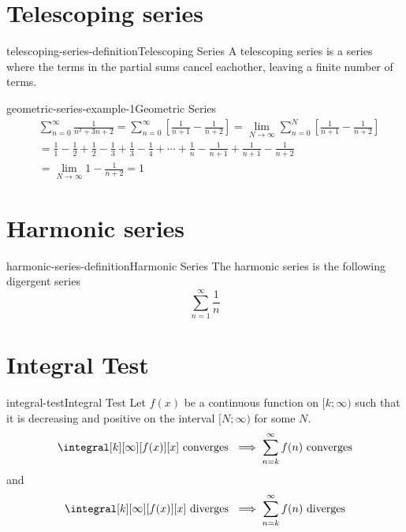 \documentclass[preview]{standalone}
\begin{document}
\section{Telescoping series}

\begin{snippetdefinition}{telescoping-series-definition}{Telescoping Series}
    A telescoping series is a series where the terms in the partial sums cancel eachother,
    leaving a finite number of terms.
\end{snippetdefinition}

\begin{snippetexample}{geometric-series-example-1}{Geometric Series}
    \begin{align*}
        &\sum_{n=0}^\infty \frac{1}{n^2 + 3n + 2}
        = \sum_{n=0}^\infty \left[ \frac{1}{n+1} - \frac{1}{n+2} \right]
        = \lim_{N \to \infty} \sum_{n=0}^N \left[ \frac{1}{n+1} - \frac{1}{n+2} \right] \\
        &= \frac{1}{1} - \frac{1}{2} + \frac{1}{2} - \frac{1}{3}
        + \frac{1}{3} - \frac{1}{4} + \cdots + \frac{1}{n} - \frac{1}{n+1} +
        \frac{1}{n+1} - \frac{1}{n+2} \\
        &= \lim_{N \to \infty} 1 - \frac{1}{n+2} = 1
    \end{align*}
\end{snippetexample}

\section{Harmonic series}

\begin{snippetdefinition}{harmonic-series-definition}{Harmonic Series}
    The harmonic series is the following digergent series
    \[
        \sum_{n=1}^\infty \frac{1}{n}
    \]
\end{snippetdefinition}

\section{Integral Test}

\begin{snippetdefinition}{integral-test}{Integral Test}
    Let \(f(x)\) be a continuous function on \([k;\infty)\)
    such that it is decreasing and positive on the interval \([N; \infty)\)
    for some \(N\).
    \[
        \integral[k][\infty][f(x)][x] \text{ converges } \implies
        \sum_{n=k}^{\infty} f(n) \text{ converges}
    \]
    and
    \[
        \integral[k][\infty][f(x)][x] \text{ diverges } \implies
        \sum_{n=k}^{\infty} f(n) \text{ diverges}
    \]
\end{snippetdefinition}
\end{document}
